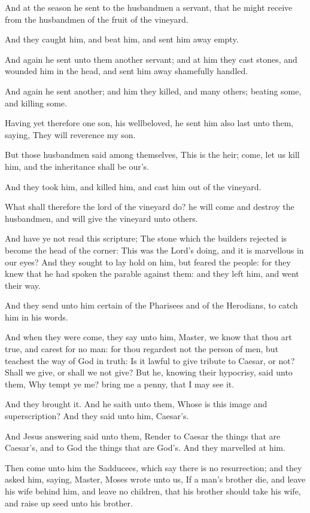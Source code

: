 \verse And at the season he sent to the husbandmen a servant, that he might receive from the husbandmen of the fruit of the vineyard.

\verse And they caught him, and beat him, and sent him away empty.

\verse And again he sent unto them another servant; and at him they cast stones, and wounded him in the head, and sent him away shamefully handled.

\verse And again he sent another; and him they killed, and many others; beating some, and killing some.

\verse Having yet therefore one son, his wellbeloved, he sent him also last unto them, saying, They will reverence my son.

\verse But those husbandmen said among themselves, This is the heir; come, let us kill him, and the inheritance shall be our's.

\verse And they took him, and killed him, and cast him out of the vineyard.

\verse What shall therefore the lord of the vineyard do? he will come and destroy the husbandmen, and will give the vineyard unto others.

\verse And have ye not read this scripture; The stone which the builders rejected is become the head of the corner: \verse This was the Lord's doing, and it is marvellous in our eyes?  \verse And they sought to lay hold on him, but feared the people: for they knew that he had spoken the parable against them: and they left him, and went their way.

\verse And they send unto him certain of the Pharisees and of the Herodians, to catch him in his words.

\verse And when they were come, they say unto him, Master, we know that thou art true, and carest for no man: for thou regardest not the person of men, but teachest the way of God in truth: Is it lawful to give tribute to Caesar, or not?  \verse Shall we give, or shall we not give? But he, knowing their hypocrisy, said unto them, Why tempt ye me? bring me a penny, that I may see it.

\verse And they brought it. And he saith unto them, Whose is this image and superscription? And they said unto him, Caesar's.

\verse And Jesus answering said unto them, Render to Caesar the things that are Caesar's, and to God the things that are God's. And they marvelled at him.

\verse Then come unto him the Sadducees, which say there is no resurrection; and they asked him, saying, \verse Master, Moses wrote unto us, If a man's brother die, and leave his wife behind him, and leave no children, that his brother should take his wife, and raise up seed unto his brother.

